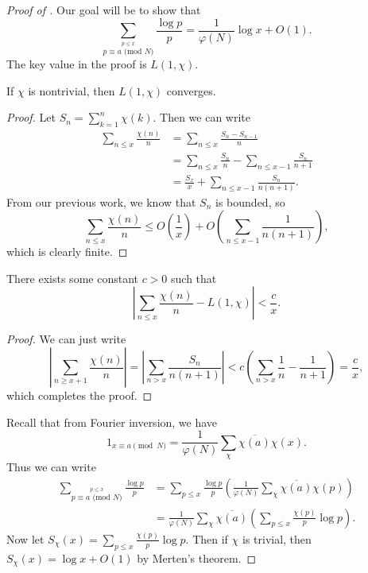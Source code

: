 \documentclass{scrartcl}
\begin{document}
\begin{proof}[Proof of ]
	Our goal will be to show that 
	$$\sum_{\stackrel{p\le x}{p\equiv a \text{ (mod } N)}} \frac{\log p}{p} = \frac{1}{\varphi(N)} \log x + O(1).$$
	The key value in the proof is $L(1, \chi)$. 
	
	\begin{claim}
		If $\chi$ is nontrivial, then $L(1, \chi)$ converges. 
	\end{claim}
	
	\begin{proof}
		Let $S_n = \sum_{k=1}^n \chi(k)$. Then we can write 
		\begin{align*}
			\sum_{n\le x}\frac{\chi(n)}{n} &= \sum_{n\le x}\frac{S_n-S_{n-1}}{n} \\
			&= \sum_{n\le x} \frac{S_n}{n} - \sum_{n\le x-1} \frac{S_n}{n+1} \\
			&= \frac{S_x}{x}+\sum_{n\le x-1} \frac{S_n}{n(n+1)}.
		\end{align*}
		From our previous work, we know that $S_n$ is bounded, so 
		$$\sum_{n\le x} \frac{\chi(n)}{n} \le O\left(\frac{1}{x}\right)+O\left(\sum_{n\le x-1}\frac{1}{n(n+1)}\right),$$
		which is clearly finite. 
	\end{proof}
	
	\begin{claim}
		\label{clm:6}
		There exists some constant $c>0$ such that 
		$$\left | \sum_{n\le x}\frac{\chi(n)}{n} - L(1, \chi)\right | <\frac{c}{x}.$$
	\end{claim}
	
	\begin{proof}
		We can just write 
		$$\left | \sum_{n\ge x+1} \frac{\chi(n)}{n} \right | = \left | \sum_{n>x} \frac{S_n}{n(n+1)}\right |<
		c\left(\sum_{n>x} \frac{1}{n}-\frac{1}{n+1}\right) = \frac{c}{x},$$
		which completes the proof. 
	\end{proof}
	
	Recall that from Fourier inversion, we have 
	$$1_{x\equiv a \pmod N} = \frac{1}{\varphi(N)}\sum_{\chi} \overline{\chi(a)} \chi(x).$$
	Thus we can write 
	\begin{align*}
		\sum_{\stackrel{p\le x}{p\equiv a \text{ (mod } N)}} \frac{\log p}{p} 
		&= \sum_{p\le x} \frac{\log p}{p} \left(\frac{1}{\varphi(N)} \sum_{\chi} \overline{\chi(a)} \chi(p)\right) \\
		&= \frac{1}{\varphi(N)} \sum_{\chi} \overline{\chi(a)}\left(\sum_{p\le x}\frac{\chi(p)}{p}\log p\right).
	\end{align*}
	Now let $S_\chi(x) = \sum_{p\le x} \frac{\chi(p)}{p}\log p$. 
	Then if $\chi$ is trivial, then $S_\chi(x) = \log x+O(1)$ by Merten's theorem.
	

\end{proof}
\end{document}
